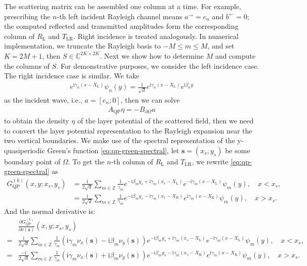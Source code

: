 \documentclass[11pt,fleqn]{article}
\newcommand{\ii}{\mathrm{i}}
\theoremstyle{definition}
\theoremstyle{remark}
\begin{document}
The scattering matrix can be assembled one column at a time. For example, prescribing the \(n\)-th left incident Rayleigh channel means \(a^\rightarrow=e_n\) and \(b^\leftarrow=0\); the computed reflected and transmitted amplitudes form the corresponding column of \(R_\mathrm{L}\) and \(T_{\mathrm{LR}}\). Right incidence is treated analogously.
In numerical implementation, we truncate the Rayleigh basis to \(-M\leq m\leq M\), and set \(K=2M+1\), then $S \in \mathbb{C}^{2K\times 2K}$. Next we show how to determine $M$ and compute the columns of $S$. For demonstrative purposes, we consider the left incidence case. The right incidence case is similar. We take \begin{align*}
  e^{\ii \gamma_n (x - X_\mathrm{L})} \psi_n(y) = \frac{1}{\sqrt{d}} e^{\ii \gamma_n (x - X_\mathrm{L})} e^{\ii \beta_n y}
\end{align*}
as the incident wave, i.e., $a = [e_n; 0]$, then we can solve \begin{align*}
  A_\mathrm{QP}\eta = -B_{\partial \Omega} a
\end{align*}
to obtain the density $\eta$ of the layer potential of the scattered field, then we need 
to convert the layer potential representation to the Rayleigh expansion near the 
two vertical boundaries. We make use of the spectral representation of the y-quasiperiodic Green's function \eqref{eq:qp-green-spectral},
let $\mathbf{s} = (x_s, y_s)$ be some boundary point of $\Omega$. To get the $n$-th column of $R_\mathrm{L}$ and $T_{\mathrm{LR}}$, we rewrite \eqref{eq:qp-green-spectral} as \begin{align*}
  G_\mathrm{QP}^{(k)}(x,y;x_s,y_s) &= \frac{\ii}{2\sqrt{d}} \sum_{m\in\mathbb{Z}} \frac{1}{\gamma_m} e^{-\ii \beta_m y_s + \ii \gamma_m (x_s - X_\mathrm{L})} e^{-\ii \gamma_m (x - X_\mathrm{L})} \psi_m(y),\quad x < x_s,\\
  &= \frac{\ii}{2\sqrt{d}} \sum_{m\in\mathbb{Z}} \frac{1}{\gamma_m} e^{-\ii \beta_m y_s - \ii \gamma_m (x_s - X_\mathrm{R})} e^{\ii \gamma_m (x - X_\mathrm{R})} \psi_m(y),\quad x > x_s.
\end{align*}
And the normal derivative is: \begin{align*}
  &\frac{\partial G_\mathrm{QP}^{(k)}}{\partial \nu(\mathbf{s})}(x,y;x_s,y_s) \\
  ={}& \frac{\ii}{2\sqrt{d}} \sum_{m\in\mathbb{Z}} \frac{1}{\gamma_m} (\ii \gamma_m \nu_x(\mathbf{s}) - \ii \beta_m \nu_y(\mathbf{s})) e^{-\ii \beta_m y_s + \ii \gamma_m (x_s - X_\mathrm{L})} e^{-\ii \gamma_m (x - X_\mathrm{L})} \psi_m(y),\quad x < x_s,\\
  ={}& \frac{-\ii}{2\sqrt{d}} \sum_{m\in\mathbb{Z}} \frac{1}{\gamma_m} (\ii \gamma_m \nu_x(\mathbf{s}) + \ii \beta_m \nu_y(\mathbf{s})) e^{-\ii \beta_m y_s - \ii \gamma_m (x_s - X_\mathrm{R})} e^{\ii \gamma_m (x - X_\mathrm{R})} \psi_m(y) ,\quad x > x_s.
\end{align*}
\end{document}
